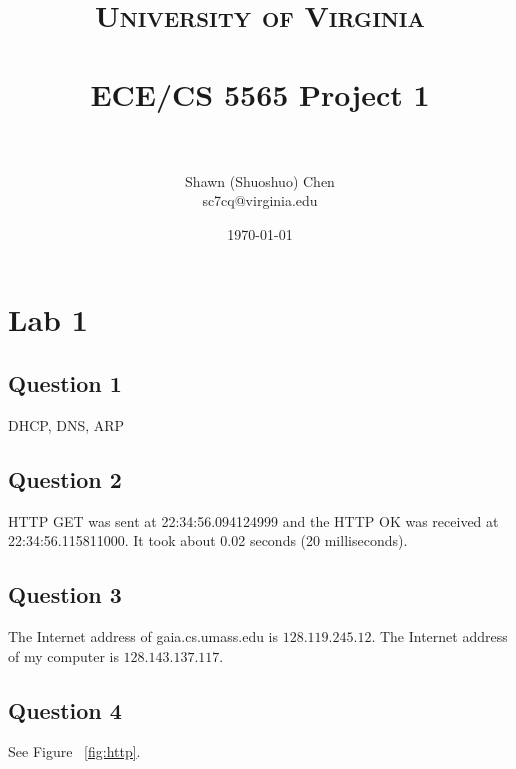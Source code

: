 \documentclass[titlepage, paper=a4, fontsize=11pt]{scrartcl} %
\title{	
\normalfont \normalsize 
\textsc{University of Virginia} \\ [25pt] %
\horrule{0.5pt} \\[0.4cm] %
\huge ECE/CS 5565 Project 1 \\ %
\horrule{2pt} \\[0.5cm] %
}
\author{Shawn (Shuoshuo) Chen\\sc7cq@virginia.edu} %
\date{\normalsize\today} %
\numberwithin{equation}{section} %
\numberwithin{figure}{section} %
\numberwithin{table}{section} %
\begin{document}
\maketitle %


\section*{\textbf{Lab 1}}
\subsection*{Question 1}
DHCP, DNS, ARP
\\

\subsection*{Question 2}
HTTP GET was sent at 22:34:56.094124999 and the HTTP OK was received at 22:34:56.115811000.
It took about 0.02 seconds (20 milliseconds).
\\

\subsection*{Question 3}
The Internet address of gaia.cs.umass.edu is $128.119.245.12$. The Internet address of my
computer is $128.143.137.117$.
\\

\subsection*{Question 4}
See Figure ~\ref{fig:http}.
\\[12pt]
\end{document}
